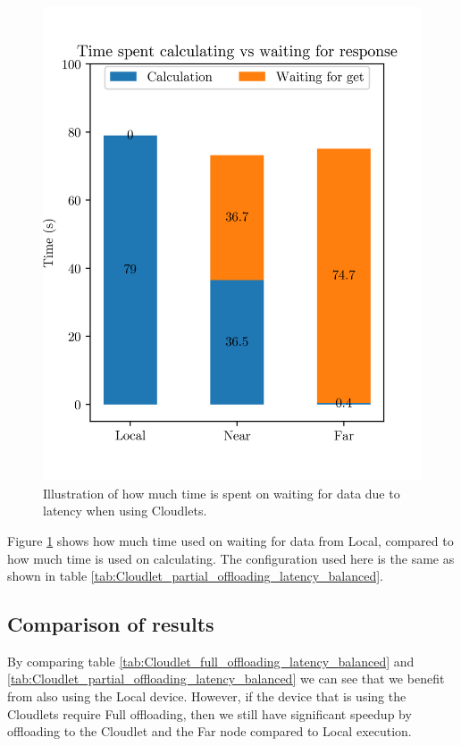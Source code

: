 \begin{figure}[t]
    \centering
    \includegraphics[scale=1]{chapters/evaluation/figures/Cloudlet_bar_latency.png}
    \caption{Illustration of how much time is spent on waiting for data due to latency when using Cloudlets.}
    \label{fig:Cloudlet_latency_bar}
\end{figure}
Figure \ref{fig:Cloudlet_latency_bar} shows how much time used on waiting for data from Local, compared to how much time is used on calculating. The configuration used here is the same as shown in table \ref{tab:Cloudlet_partial_offloading_latency_balanced}.




\subsection{Comparison of results}
By comparing table \ref{tab:Cloudlet_full_offloading_latency_balanced} and \ref{tab:Cloudlet_partial_offloading_latency_balanced} we can see that we benefit from also using the Local device. However, if the device that is using the Cloudlets require Full offloading, then we still have significant speedup by offloading to the Cloudlet and the Far node compared to Local execution.

